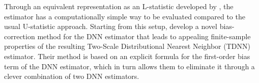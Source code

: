 \documentclass[letterpaper,10pt]{article}
\numberwithin{equation}{section}
\numberwithin{theorem}{section}
\theoremstyle{definition}
\newcommand{\1}{\mathbb{1}}
\begin{document}
Through an equivalent representation as an L-statistic developed by \citet{steele_exact_2009}, the estimator has a computationally simple way to be evaluated compared to the usual U-statistic approach.
Starting from this setup, \citet{demirkaya_optimal_2024} develop a novel bias-correction method for the DNN estimator that leads to appealing finite-sample properties of the resulting Two-Scale Distributional Nearest Neighbor (TDNN) estimator.
Their method is based on an explicit formula for the first-order bias term of the DNN estimator, which in turn allows them to eliminate it through a clever combination of two DNN estimators.
\end{document}
